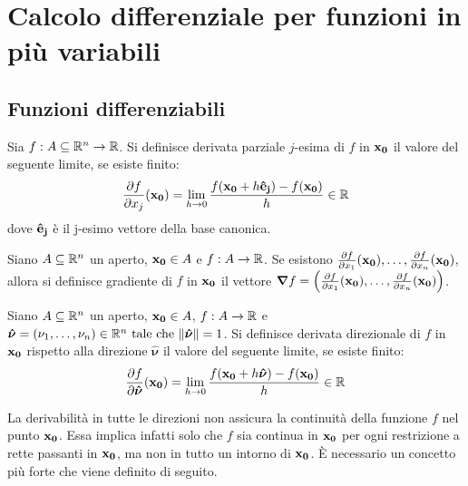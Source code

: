 \chapter{Calcolo differenziale per funzioni in più variabili}

\section{Funzioni differenziabili}

\begin{definition}
    Sia $f: A \subseteq \mathbb{R}^n \to \mathbb{R}$. Si definisce derivata parziale $j$-esima di $f$ in $\vb{x_0}$ il valore del seguente limite, se esiste finito:
    $$
        \frac{\partial f}{\partial x_j} (\vb{x_0}) = \displaystyle \lim_{h\to 0} \frac{f(\vb{x_0} + h\vb{\hat{e}_j}) - f(\vb{x_0})}{h} \in \mathbb{R}
    $$
    dove $\vb{\hat{e}_j}$ è il j-esimo vettore della base canonica.
\end{definition}

\begin{definition}
    [Gradiente]
    Siano $A \subseteq \mathbb{R}^n$ un aperto, $\vb{x_0} \in A$ e $f:A \to \mathbb{R}$. Se esistono $\frac{\partial f}{\partial x_1}(\vb{x_0}),\dots,\\\frac{\partial f}{\partial x_n}(\vb{x_0})$, allora si definisce gradiente di $f$ in $\vb{x_0}$ il vettore $\bm{\nabla}f = \left( \frac{\partial f}{\partial x_1} (\vb{x_0}), \dots, \frac{\partial f}{\partial x_n}(\vb{x_0}) \right)$.
\end{definition}

\begin{definition}
    Siano $A \subseteq \mathbb{R}^n$ un aperto, $\vb{x_0} \in A$, $f:A \to \mathbb{R}$ e $\bm{\hat{\nu}} = (\nu_1,\dots,\nu_n) \in \mathbb{R}^n \text{ tale che } \norm{\bm{\hat{\nu}}}=1$. Si definisce derivata direzionale di $f$ in $\vb{x_0}$ rispetto alla direzione $\bm{\hat{\nu}}$ il valore del seguente limite, se esiste finito:
    $$
        \frac{\partial f}{\partial \bm{\hat{\nu}}} (\vb{x_0}) = \displaystyle \lim_{h\to 0} \frac{f(\vb{x_0} + h\bm{\hat{\nu}}) - f(\vb{x_0})}{h} \in \mathbb{R}
    $$
\end{definition}

\begin{remark}
    La derivabilità in tutte le direzioni non assicura la continuità della funzione $f$ nel punto $\vb{x_0}$. Essa implica infatti solo che $f$ sia continua in $\vb{x_0}$ per ogni restrizione a rette passanti in $\vb{x_0}$, ma non in tutto un intorno di $\vb{x_0}$. È necessario un concetto più forte che viene definito di seguito.
\end{remark}

